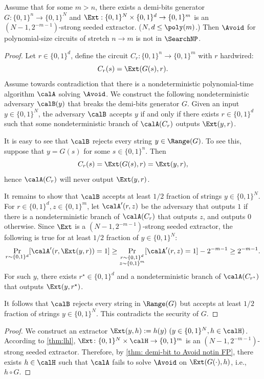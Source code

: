 \begin{theorem}\label{thm: demi-bit to Avoid notin FP}
	Assume that for some $m > n$, there exists a demi-bits generator $G: \{0, 1\}^n \to \{0, 1\}^N$ and $\Ext: \{0, 1\}^N \times \{0, 1\}^d \to \{0, 1\}^m$ is an $(N-1, 2^{-m-1})$-strong seeded extractor. ($N,d\leq\poly(m)$.) Then $\Avoid$ for polynomial-size circuits of stretch $n\to m$ is not in $\SearchNP$.  %
\end{theorem}
\begin{proof}
	Let $r \in \{0, 1\}^d$, define the circuit $C_r: \{0, 1\}^n \to \{0, 1\}^m$ with $r$ hardwired:
	\[C_r(s) = \Ext(G(s), r).\]
	Assume towards contradiction that there is a nondeterministic polynomial-time algorithm $\calA$ solving $\Avoid$. We construct the following nondeterministic adversary $\calB(y)$ that breaks the demi-bits generator $G$. Given an input $y \in \{0, 1\}^N$, the adversary $\calB$ accepts $y$ if and only if there exists $r \in \{0, 1\}^d$ such that some nondeterministic branch of $\calA(C_r)$ outputs $\Ext(y, r)$.

	It is easy to see that $\calB$ rejects every string $y\in\Range(G)$. To see this, suppose that $y = G(s)$ for some $s \in \{0, 1\}^n$. Then
	\[C_r(s) = \Ext(G(s), r) = \Ext(y, r),\]
	hence $\calA(C_r)$ will never output $\Ext(y, r)$.

	It remains to show that $\calB$ accepts at least $1/2$ fraction of strings $y \in \{0, 1\}^N$. For $r\in \{0, 1\}^d, z\in\{0, 1\}^m$, let $\calA'(r, z)$ be the adversary that outputs $1$ if there is a nondeterministic branch of $\calA(C_r)$ that outputs $z$, and outputs $0$ otherwise. Since $\Ext$ is a $(N-1, 2^{-m-1})$-strong seeded extractor, %
    the following is true for at least $1/2$ fraction of $y \in \{0, 1\}^N$:
	\[\Pr_{r\sim \{0, 1\}^d}[\calA'(r, \Ext(y, r)) = 1] \ge \Pr_{\substack{r\sim \{0, 1\}^d\\z\sim \{0, 1\}^m}}[\calA'(r, z) = 1] - 2^{-m-1} \ge 2^{-m-1}.\]
	For such $y$, there exists $r^\star\in \{0, 1\}^d$ and a nondeterministic branch of $\calA(C_{r^\star})$ that outputs $\Ext(y, r^\star)$.
	
	It follows that $\calB$ rejects every string in $\Range(G)$ but accepts at least $1/2$ fraction of strings $y\in \{0, 1\}^N$. This contradicts the security of $G$.
\end{proof}


\ThmDemiBitsPlusHash*
\begin{proof}
    We construct an extractor
    \(\Ext(y,h):=h(y)~(y\in\{0,1\}^N,h\in\calH)\). 
    According to \autoref{thm:lhl}, $\Ext\colon\{0,1\}^N\times\calH\to\{0,1\}^m$ is an $(N-1,2^{-m-1})$-strong seeded extractor. Therefore, by \autoref{thm: demi-bit to Avoid notin FP}, there exists $h\in\calH$ such that $\calA$ fails to solve $\Avoid$ on $\Ext(G(\cdot),h)$, i.e., $h\circ G$.
\end{proof}

